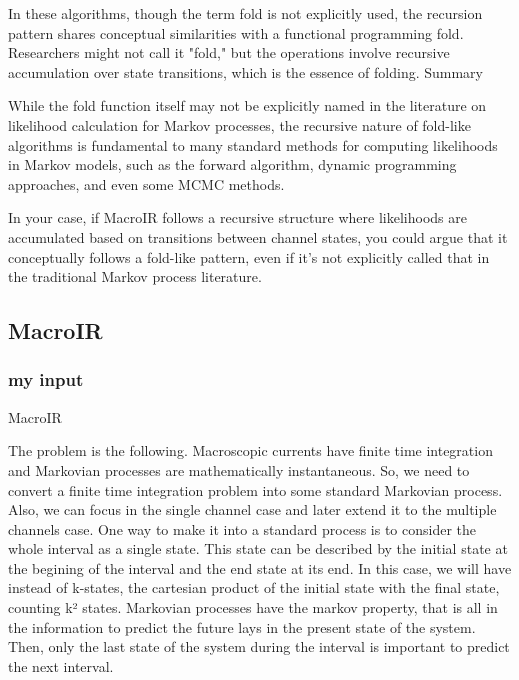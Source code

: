 \documentclass[pdflatex,sn-mathphys-num]{sn-jnl}%
\theoremstyle{thmstyleone}%
\theoremstyle{thmstyletwo}%
\theoremstyle{thmstylethree}%
\begin{document}
In these algorithms, though the term fold is not explicitly used, the recursion pattern shares conceptual similarities with a functional programming fold. Researchers might not call it "fold," but the operations involve recursive accumulation over state transitions, which is the essence of folding.
Summary

While the fold function itself may not be explicitly named in the literature on likelihood calculation for Markov processes, the recursive nature of fold-like algorithms is fundamental to many standard methods for computing likelihoods in Markov models, such as the forward algorithm, dynamic programming approaches, and even some MCMC methods.

In your case, if MacroIR follows a recursive structure where likelihoods are accumulated based on transitions between channel states, you could argue that it conceptually follows a fold-like pattern, even if it's not explicitly called that in the traditional Markov process literature.


\subsection{MacroIR }
\subsubsection{my input}
MacroIR

The problem is the following. Macroscopic currents have finite time integration and Markovian processes are mathematically instantaneous. So, we need to convert a finite time integration problem into some standard Markovian process. Also, we can focus in the single channel case and later extend it to the multiple channels case. One way to make it into a standard process is to consider the whole interval as a single state. This state can be described by the initial state at the begining of the interval and the end state at its end. In this case, we will have instead of k-states, the cartesian product of the initial state with the final state, counting k² states.  
Markovian processes have the markov property, that is all in the information to predict the future lays in the present state of the system. Then, only the last state of the system during the interval is important to predict the next interval. 
\end{document}
